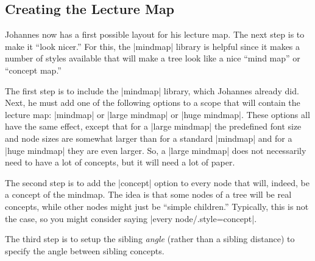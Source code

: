 \subsection{Creating the Lecture Map}

Johannes now has a first possible layout for his lecture map. The next
step is to make it ``look nicer.'' For this, the |mindmap| library is
helpful since it makes a number of styles available that will make a
tree look like a nice ``mind map'' or ``concept map.''

The first step is to include the |mindmap| library, which Johannes
already did. Next, he must add one of the following options to a scope
that will contain the lecture map: |mindmap| or |large mindmap| or
|huge mindmap|. These options all have the same effect, except that
for a |large mindmap| the predefined font size and node sizes are
somewhat larger than for a standard |mindmap| and for a |huge mindmap|
they are even larger. So, a |large mindmap| does not necessarily need
to have a lot of concepts, but it will need a lot of paper.

The second step is to add the |concept| option to every node that
will, indeed, be a concept of the mindmap. The idea is that some nodes
of a tree will be real concepts, while other nodes might just be
``simple children.'' Typically, this is not the case, so you might
consider saying |every node/.style=concept|.

The third step is to setup the sibling \emph{angle} (rather than a
sibling distance) to specify the angle between sibling concepts.

